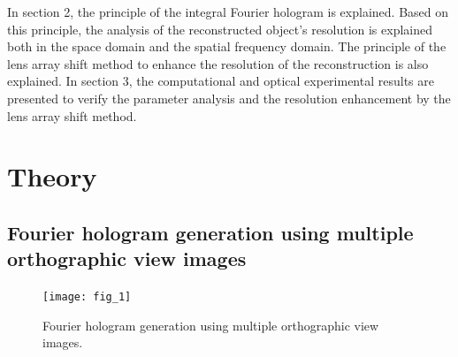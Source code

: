 \documentclass[10pt,letterpaper]{article}
\begin{document}
In section 2, the principle of the integral Fourier hologram is explained. Based on this principle, the analysis of the reconstructed object’s resolution is explained both in the space domain and the spatial frequency domain. The principle of the lens array shift method to enhance the resolution of the reconstruction is also explained. In section 3, the computational and optical experimental results are presented to verify the parameter analysis and the resolution enhancement by the lens array shift method.

\section{Theory}

\subsection{Fourier hologram generation using multiple orthographic view images}
\begin{figure}[htp]
\centering
\texttt{[image: fig\_1]}
\caption{Fourier hologram generation using multiple orthographic view images.}
\label{fig_FT_holo}
\end{figure}
\end{document}
